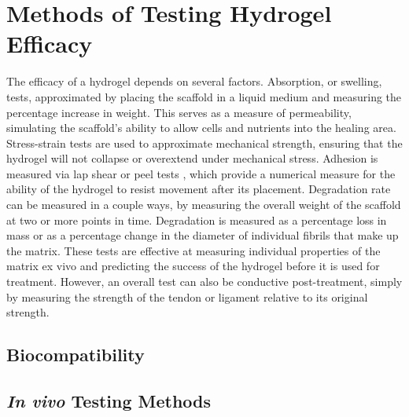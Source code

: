 \section{Methods of Testing Hydrogel Efficacy}

The efficacy of a hydrogel depends on several factors. Absorption, or swelling, tests,
approximated by placing the scaffold in a liquid medium and measuring the percentage increase
in weight. This serves as a measure of permeability, simulating the scaffold's ability to allow cells
and nutrients into the healing area. Stress-strain tests are used to approximate mechanical
strength, ensuring that the hydrogel will not collapse or overextend under mechanical stress.
Adhesion is measured via lap shear or peel tests \autocite{RN5}, which provide a numerical
measure for the ability of the hydrogel to resist movement after its placement. Degradation rate
can be measured in a couple ways, by measuring the overall weight of the scaffold at two or more
points in time. Degradation is measured as a percentage loss in mass or as a
percentage change in the diameter of individual fibrils that make up the matrix. These tests are
effective at measuring individual properties of the matrix ex vivo and predicting the success of
the hydrogel before it is used for treatment. However, an overall test can also be conductive
post-treatment, simply by measuring the strength of the tendon or ligament relative to its original
strength.

\subsection{Biocompatibility}



\subsection{\textit{In vivo} Testing Methods}

